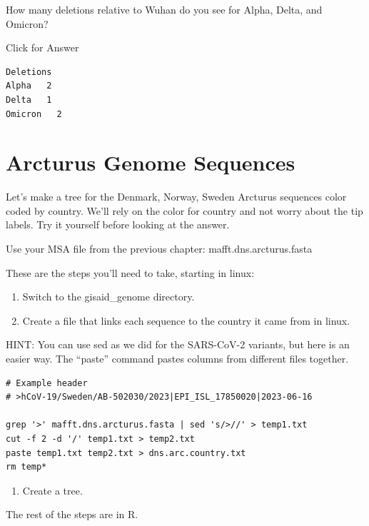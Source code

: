 \documentclass[
]{book}
\providecommand{\tightlist}{%
  \setlength{\itemsep}{0pt}\setlength{\parskip}{0pt}}
\begin{document}
\hfill\break

How many deletions relative to Wuhan do you see for Alpha, Delta, and Omicron?

Click for Answer

\begin{verbatim}
Deletions
Alpha   2
Delta   1
Omicron   2
\end{verbatim}

\hfill\break

\hypertarget{arcturus-genome-sequences}{%
\section{Arcturus Genome Sequences}\label{arcturus-genome-sequences}}

Let's make a tree for the Denmark, Norway, Sweden Arcturus sequences color coded by country. We'll rely on the color for country and not worry about the tip labels. Try it yourself before looking at the answer.

Use your MSA file from the previous chapter: mafft.dns.arcturus.fasta

These are the steps you'll need to take, starting in linux:

\begin{enumerate}
\def\labelenumi{\arabic{enumi}.}
\tightlist
\item
  Switch to the gisaid\_genome directory.
\item
  Create a file that links each sequence to the country it came from in linux.
\end{enumerate}

HINT: You can use sed as we did for the SARS-CoV-2 variants, but here is an easier way. The ``paste'' command pastes columns from different files together.

\begin{verbatim}
# Example header
# >hCoV-19/Sweden/AB-502030/2023|EPI_ISL_17850020|2023-06-16

grep '>' mafft.dns.arcturus.fasta | sed 's/>//' > temp1.txt
cut -f 2 -d '/' temp1.txt > temp2.txt
paste temp1.txt temp2.txt > dns.arc.country.txt
rm temp*
\end{verbatim}

\begin{enumerate}
\def\labelenumi{\arabic{enumi}.}
\setcounter{enumi}{2}
\tightlist
\item
  Create a tree.
\end{enumerate}

The rest of the steps are in R.
\end{document}
